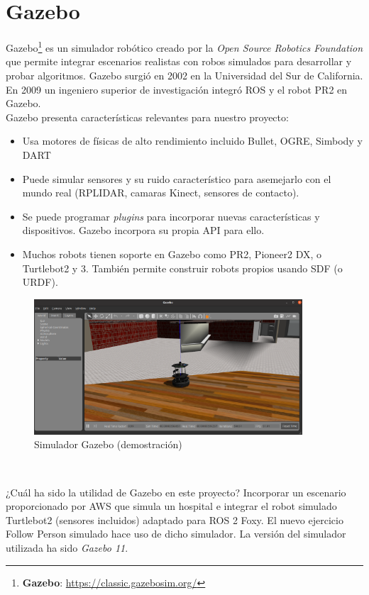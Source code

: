 \section{Gazebo}
\label{sec:gazebo}

Gazebo\footnote{\textbf{Gazebo}: \url{https://classic.gazebosim.org/}} es un simulador robótico creado por la \textit{Open Source Robotics Foundation} que permite integrar escenarios realistas con robos simulados para desarrollar y probar algoritmos. Gazebo surgió en 2002 en la Universidad del Sur de California. En 2009 un ingeniero superior de investigación integró ROS y el robot PR2 en Gazebo.\\

Gazebo presenta características relevantes para nuestro proyecto:
\begin{itemize}
	\item Usa motores de físicas de alto rendimiento incluido Bullet, OGRE, Simbody y DART
	\item Puede simular sensores y su ruido característico para asemejarlo con el mundo real (RPLIDAR, camaras Kinect, sensores de contacto).
	\item Se puede programar \textit{plugins} para incorporar nuevas características y dispositivos. Gazebo incorpora su propia API para ello.
	\item Muchos robots tienen soporte en Gazebo como PR2, Pioneer2 DX,  o Turtlebot2 y 3. También permite construir robots propios usando SDF (o URDF).
\end{itemize}

\begin{figure} [H]
  \begin{center}
    \includegraphics[width=10cm]{imagenes/cap3/simulacion-gazebo.png}
  \end{center}
  \caption{Simulador Gazebo (demostración)}
  \label{fig:simulador_gazebo}
\end{figure}\

¿Cuál ha sido la utilidad de Gazebo en este proyecto? Incorporar un escenario proporcionado por AWS que simula un hospital e integrar el robot simulado Turtlebot2 (sensores incluidos) adaptado para ROS 2 Foxy. El nuevo ejercicio Follow Person simulado hace uso de dicho simulador. La versión del simulador utilizada ha sido \textit{Gazebo 11}.\\




